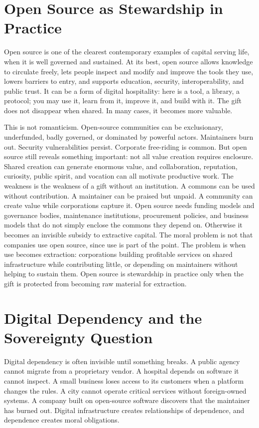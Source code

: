\documentclass[11pt,a4paper,oneside]{book}
\begin{document}
\section*{Open Source as Stewardship in Practice}

Open source is one of the clearest contemporary examples of capital serving life, when it is well governed and sustained. At its best, open source allows knowledge to circulate freely, lets people inspect and modify and improve the tools they use, lowers barriers to entry, and supports education, security, interoperability, and public trust. It can be a form of digital hospitality: here is a tool, a library, a protocol; you may use it, learn from it, improve it, and build with it. The gift does not disappear when shared. In many cases, it becomes more valuable.

This is not romanticism. Open-source communities can be exclusionary, underfunded, badly governed, or dominated by powerful actors. Maintainers burn out. Security vulnerabilities persist. Corporate free-riding is common. But open source still reveals something important: not all value creation requires enclosure. Shared creation can generate enormous value, and collaboration, reputation, curiosity, public spirit, and vocation can all motivate productive work. The weakness is the weakness of a gift without an institution. A commons can be used without contribution. A maintainer can be praised but unpaid. A community can create value while corporations capture it. Open source needs funding models and governance bodies, maintenance institutions, procurement policies, and business models that do not simply enclose the commons they depend on. Otherwise it becomes an invisible subsidy to extractive capital. The moral problem is not that companies use open source, since use is part of the point. The problem is when use becomes extraction: corporations building profitable services on shared infrastructure while contributing little, or depending on maintainers without helping to sustain them. Open source is stewardship in practice only when the gift is protected from becoming raw material for extraction.

\section*{Digital Dependency and the Sovereignty Question}

Digital dependency is often invisible until something breaks. A public agency cannot migrate from a proprietary vendor. A hospital depends on software it cannot inspect. A small business loses access to its customers when a platform changes the rules. A city cannot operate critical services without foreign-owned systems. A company built on open-source software discovers that the maintainer has burned out. Digital infrastructure creates relationships of dependence, and dependence creates moral obligations.
\end{document}
